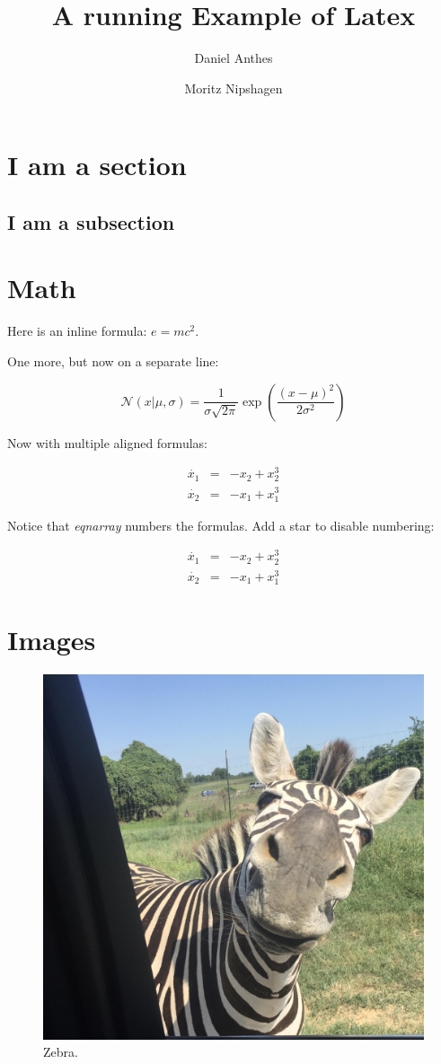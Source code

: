 \documentclass[12pt]{scrarticle}
\title{A running Example of Latex}
\author{Daniel Anthes \and Moritz Nipshagen}
\date{} %
\begin{document}
\maketitle

\begin{abstract}
    \lipsum[3]
\end{abstract}

\section{I am a section}

\lipsum[1]

\subsection{I am a subsection}

\lipsum[2]

\section{Math}

Here is an inline formula: $e = mc^2$.

One more, but now on a separate line:

$$
\mathcal{N}(x|\mu, \sigma) = \frac{1}{\sigma \sqrt{2\pi}}\exp \left({\frac{(x - \mu)^2}{2\sigma^2}}\right)
$$

Now with multiple aligned formulas:

\begin{eqnarray}
\dot{x_1} &=& -x_2 + x_{2}^3\\
\dot{x_2} &=& -x_1 + x_{1}^3
\end{eqnarray}

Notice that \textit{eqnarray} numbers the formulas. Add a star to disable numbering:


\begin{eqnarray*}
\dot{x_1} &=& -x_2 + x_{2}^3\\
\dot{x_2} &=& -x_1 + x_{1}^3
\end{eqnarray*}

\section{Images}

\begin{figure}[h!]
    \centering
    \includegraphics[width=.3\linewidth]{zebra.jpeg}
    \caption{Zebra.}
    \label{fig:examplefig}
\end{figure}
\end{document}
